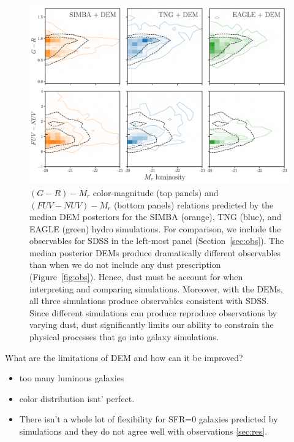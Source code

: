 \begin{figure}
\begin{center}
    \includegraphics[width=\textwidth]{figs/abc_observables.pdf}
    \caption{\label{fig:dem}
    $(G-R) - M_r$ color-magnitude (top panels) and $(FUV-NUV) - M_r$ (bottom
    panels) relations predicted by the median DEM posteriors for the SIMBA
    (orange), TNG (blue), and EAGLE (green) hydro simulations. For comparison, 
    we include the observables for SDSS in the left-most panel
    (Section~\ref{sec:obs}). The median posterior DEMs produce dramatically 
    different observables than when we do not include any dust prescription
    (Figure~\ref{fig:obs}). Hence, dust must be account for when interpreting 
    and comparing simulations. Moreover, with the DEMs, all three simulations
    produce observables consistent with SDSS. Since different simulations can 
    produce reproduce observations by varying dust, dust significantly limits
    our ability to constrain the physical processes that go into galaxy
    simulations. 
    }
\end{center}
\end{figure}

What are the limitations of DEM and how can it be improved? 
\begin{itemize}
    \item too many luminous galaxies
    \item color distribution isnt' perfect. 
    \item There isn't a whole lot of flexibility for SFR=0 galaxies predicted by
    simulations and they do not agree well with observations \ref{sec:res}. 
\end{itemize}


